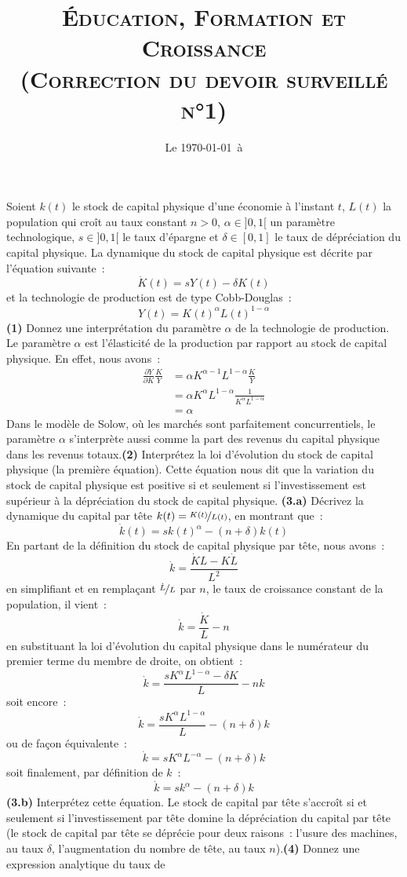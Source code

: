 \documentclass[10pt,a4paper,notitlepage]{article}
\newcommand{\question}[1]{\textbf{(#1)}}
\begin{document}
\title{\textsc{Éducation, Formation et Croissance\\ \small{(Correction du devoir surveillé n°1)}}}
\date{Le \today\ à \thistime}

\maketitle

Soient $k(t)$ le stock de  capital physique d'une économie à l'instant
$t$,  $L(t)$  la   population  qui  croît  au   taux  constant  $n>0$,
$\alpha\in]0,1[$  un  paramètre  technologique,  $s\in]0,1[$  le  taux
d'épargne  et  $\delta\in[0,1]$ le  taux  de  dépréciation du  capital
physique. La  dynamique du stock  de capital physique est  décrite par
l'équation suivante :
\[
\dot K(t) = sY(t)-\delta K(t)
\]
et la technologie de production est de type Cobb-Douglas :
\[
Y(t) = K(t)^\alpha L(t)^{1-\alpha}
\]
\question{1}  Donnez une  interprétation du  paramètre $\alpha$  de la
technologie  de production.  {\color{red}  Le  paramètre $\alpha$  est
  l'élasticité  de  la production  par  rapport  au stock  de  capital
  physique. En effet, nous avons :
\[
\begin{split}
\frac{\partial Y}{\partial K}\frac{K}{Y} &= \alpha K^{\alpha-1}L^{1-\alpha}\frac{K}{Y}\\
&= \alpha K^{\alpha}L^{1-\alpha}\frac{1}{K^{\alpha}L^{1-\alpha}}\\
&= \alpha
\end{split}
\]
Dans  le   modèle  de   Solow,  où   les  marchés   sont  parfaitement
concurrentiels, le paramètre $\alpha$ s'interprète aussi comme la part
des revenus du capital  physique dans les revenus totaux.}\question{2}
Interprétez  la  loi d'évolution  du  stock  de capital  physique  (la
première  équation).   {\color{red} Cette  équation  nous  dit que  la
  variation du stock de capital  physique est positive si et seulement
  si  l'investissement est  supérieur à  la dépréciation  du stock  de
  capital physique.}  \question{3.a} Décrivez la dynamique  du capital
par tête $k(t)=\nicefrac{K(t)}{L(t)}$, en montrant que :
\[
\dot k(t) = sk(t)^{\alpha}-(n+\delta)k(t)
\]  {\color{red} En  partant  de  la définition  du  stock de  capital
  physique par tête, nous avons :
\[
\dot k = \frac{\dot K L - K\dot L}{L^2}
\]
en simplifiant  et en  remplaçant $\nicefrac{\dot  L}{L}$ par  $n$, le
taux de croissance constant de la population, il vient :
\[
\dot k = \frac{\dot K}{L} - n
\]
en  substituant  la  loi  d'évolution  du  capital  physique  dans  le
numérateur du premier terme du membre de droite, on obtient :
\[
\dot k = \frac{sK^{\alpha}L^{1-\alpha}-\delta K}{L} - n k
\]
soit encore :
\[
\dot k = \frac{sK^{\alpha}L^{1-\alpha}}{L} - (n+\delta) k
\]
ou de façon équivalente :
\[
\dot k = sK^{\alpha}L^{-\alpha} - (n+\delta) k
\]
soit finalement, par définition de $k$ :
\[
\dot k = sk^{\alpha} - (n+\delta) k
\]
} \question{3.b} Interprétez cette  équation. {\color{red} Le stock de
  capital par tête  s'accroît si et seulement  si l'investissement par
  tête domine la dépréciation du capital par tête (le stock de capital
  par tête  se déprécie pour  deux raisons : l'usure des  machines, au
  taux   $\delta$,  l'augmentation   du  nombre   de  tête,   au  taux
  $n$).}\question{4}  Donnez  une  expression analytique  du  taux  de
\end{document}
